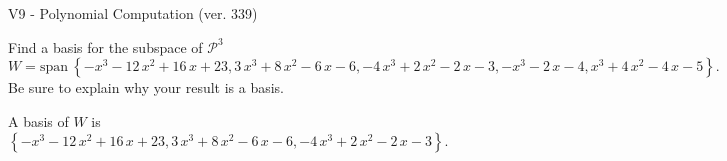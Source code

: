 \begin{exercise}
  \begin{exerciseTitle}V9 - Polynomial Computation (ver. 339)\end{exerciseTitle}
  \begin{exerciseStatement}
    Find a basis for the subspace of \(\mathcal{P}^3\) 
\[W=\mathrm{span}\ \left\{-x^{3} - 12 \, x^{2} + 16 \, x + 23 , 3 \, x^{3} + 8 \, x^{2} - 6 \, x - 6 , -4 \, x^{3} + 2 \, x^{2} - 2 \, x - 3 , -x^{3} - 2 \, x - 4 , x^{3} + 4 \, x^{2} - 4 \, x - 5\right\}.\]
 Be sure to explain why your result is a basis.


  \end{exerciseStatement}
  \begin{exerciseAnswer}
   A basis of \(W\) is  \(\left\{-x^{3} - 12 \, x^{2} + 16 \, x + 23 , 3 \, x^{3} + 8 \, x^{2} - 6 \, x - 6 , -4 \, x^{3} + 2 \, x^{2} - 2 \, x - 3\right\}\).
  


  \end{exerciseAnswer}
\end{exercise}